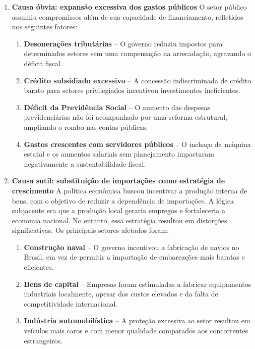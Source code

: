 \documentclass[a4paper,12pt]{article}[abntex2]
\begin{document}
\begin{enumerate}
    \item \textbf{Causa óbvia: expansão excessiva dos gastos públicos}  
    O setor público assumiu compromissos além de sua capacidade de financiamento, refletidos nos seguintes fatores:
    \begin{enumerate}
        \item \textbf{Desonerações tributárias} – O governo reduziu impostos para determinados setores sem uma compensação na arrecadação, agravando o déficit fiscal.
        \item \textbf{Crédito subsidiado excessivo} – A concessão indiscriminada de crédito barato para setores privilegiados incentivou investimentos ineficientes.
        \item \textbf{Déficit da Previdência Social} – O aumento das despesas previdenciárias não foi acompanhado por uma reforma estrutural, ampliando o rombo nas contas públicas.
        \item \textbf{Gastos crescentes com servidores públicos} – O inchaço da máquina estatal e os aumentos salariais sem planejamento impactaram negativamente a sustentabilidade fiscal.
    \end{enumerate}

    \item \textbf{Causa sutil: substituição de importações como estratégia de crescimento}  
    A política econômica buscou incentivar a produção interna de bens, com o objetivo de reduzir a dependência de importações. A lógica subjacente era que a produção local geraria empregos e fortaleceria a economia nacional. No entanto, essa estratégia resultou em distorções significativas. Os principais setores afetados foram:
    \begin{enumerate}
        \item \textbf{Construção naval} – O governo incentivou a fabricação de navios no Brasil, em vez de permitir a importação de embarcações mais baratas e eficientes.
        \item \textbf{Bens de capital} – Empresas foram estimuladas a fabricar equipamentos industriais localmente, apesar dos custos elevados e da falta de competitividade internacional.
        \item \textbf{Indústria automobilística} – A proteção excessiva ao setor resultou em veículos mais caros e com menor qualidade comparados aos concorrentes estrangeiros.
    \end{enumerate}
\end{enumerate}
\end{document}
